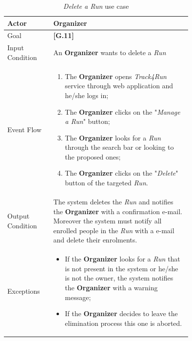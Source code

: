 \begin{center}
\begin{table}[H]
\begin{tabular}{ | l | p{0.75\linewidth} | }
  \hline
    Actor & \textbf{Organizer} \\ \hline
    Goal & \textbf{[G.11]} \\ \hline
    Input Condition & An \textbf{Organizer} wants to delete a \textit{Run} \\ \hline
    Event Flow & \begin{minipage}[t]{0.7\textwidth}
      \begin{enumerate}
        \item The \textbf{Organizer} opens \textit{Track4Run} service through web application and he/she logs in;
        \item The \textbf{Organizer} clicks on the "\textit{Manage a Run}" button;
        \item The \textbf{Organizer} looks for a \textit{Run} through the search bar or looking to the proposed ones;
        \item The \textbf{Organizer} clicks on the "\textit{Delete}" button of the targeted \textit{Run}.
      \end{enumerate}
    \smallskip
  \end{minipage} \\ \hline
  Output Condition & The system deletes the \textit{Run} and notifies the \textbf{Organizer} with a confirmation e-mail. Moreover the system must notify all enrolled people in the \textit{Run} with a e-mail and delete their enrolments. \\ \hline
  Exceptions & \begin{minipage}[t]{0.7\textwidth}
    \begin{itemize}
      \smallskip
      \item If the \textbf{Organizer} looks for a \textit{Run} that is not present in the system or he/she is not the owner, the system notifies the \textbf{Organizer} with a warning message;
      \item If the \textbf{Organizer} decides to leave the elimination process this one is aborted.
    \end{itemize}
    \smallskip
  \end{minipage}  \\ \hline
\end{tabular}
\caption{\textit{Delete a Run} use case}
\label{table:deleteRunTable}
\end{table}
\end{center}

